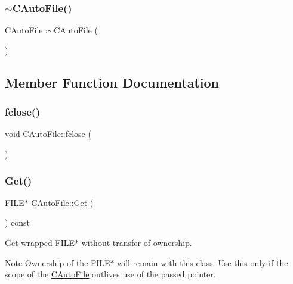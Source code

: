 \mbox{\label{class_c_auto_file_ab1362f4cb52c819c25cff4598e0f28da}} 
\subsubsection{\texorpdfstring{$\sim$\+C\+Auto\+File()}{~CAutoFile()}}
{\footnotesize\ttfamily C\+Auto\+File\+::$\sim$\+C\+Auto\+File (\begin{DoxyParamCaption}{ }\end{DoxyParamCaption})\hspace{0.3cm}{\ttfamily [inline]}}



\subsection{Member Function Documentation}
\mbox{\label{class_c_auto_file_abcbafe943bfe392c09363078fa8a4e77}} 
\subsubsection{\texorpdfstring{fclose()}{fclose()}}
{\footnotesize\ttfamily void C\+Auto\+File\+::fclose (\begin{DoxyParamCaption}{ }\end{DoxyParamCaption})\hspace{0.3cm}{\ttfamily [inline]}}

\mbox{\label{class_c_auto_file_a2c1ad2d25562fea82a54bdef2793a0dd}} 
\subsubsection{\texorpdfstring{Get()}{Get()}}
{\footnotesize\ttfamily F\+I\+LE$\ast$ C\+Auto\+File\+::\+Get (\begin{DoxyParamCaption}{ }\end{DoxyParamCaption}) const\hspace{0.3cm}{\ttfamily [inline]}}

Get wrapped F\+I\+L\+E$\ast$ without transfer of ownership. \begin{DoxyNote}{Note}
Ownership of the F\+I\+L\+E$\ast$ will remain with this class. Use this only if the scope of the \mbox{\hyperlink{class_c_auto_file}{C\+Auto\+File}} outlives use of the passed pointer. 
\end{DoxyNote}
\mbox{\label{class_c_auto_file_a883a261f0d7d0320f72152ff2167fd24}} 
